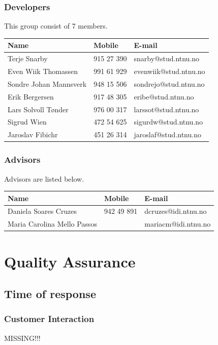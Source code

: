 \subsubsection{Developers}
This group consist of 7 members. \newline
\begin{tabular}{|l |l |l |}
	\hline
	\textbf{Name} & \textbf{Mobile} & \textbf{E-mail}  \\ \hline
	Terje Snarby & 915 27 390 & snarby@stud.ntnu.no \\ \hline
	Even Wiik Thomassen & 991 61 929 & evenwiik@stud.ntnu.no \\ \hline
	Sondre Johan Mannsverk & 948 15 506 & sondrejo@stud.ntnu.no \\ \hline
	Erik Bergersen & 917 48 305 & eribe@stud.ntnu.no \\ \hline
	Lars Solvoll Tønder & 976 00 317 & larssot@stud.ntnu.no \\ \hline
	Sigrud Wien & 472 54 625 & sigurdw@stud.ntnu.no \\ \hline
	Jaroslav Fibichr & 451 26 314 & jaroslaf@stud.ntnu.no \\ \hline
\end{tabular}

\subsubsection{Advisors}
Advisors are listed below. \newline
\begin{tabular}{|l |l |l |}
	\hline
	\textbf{Name} & \textbf{Mobile} & \textbf{E-mail}  \\ \hline
	Daniela Soares Cruzes & 942 49 891 & dcruzes@idi.ntnu.no \\ \hline
	Maria Carolina Mello Passos & & mariacm@idi.ntnu.no \\ \hline
\end{tabular}

\section{Quality Assurance}

\subsection{Time of response}

\subsubsection{Customer Interaction}
MISSING!!!

